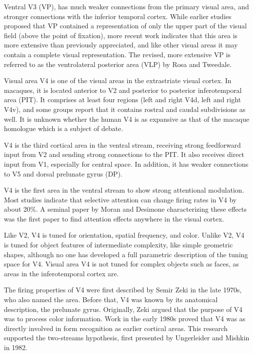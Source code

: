 Ventral V3 (VP), has much weaker connections from the primary visual area, and stronger connections with the inferior temporal cortex. While earlier studies proposed that VP contained a representation of only the upper part of the visual field (above the point of fixation), more recent work indicates that this area is more extensive than previously appreciated, and like other visual areas it may contain a complete visual representation. The revised, more extensive VP is referred to as the ventrolateral posterior area (VLP) by Rosa and Tweedale.

Visual area V4 is one of the visual areas in the extrastriate visual cortex. In macaques, it is located anterior to V2 and posterior to posterior inferotemporal area (PIT). It comprises at least four regions (left and right V4d, left and right V4v), and some groups report that it contains rostral and caudal subdivisions as well. It is unknown whether the human V4 is as expansive as that of the macaque homologue which is a subject of debate.

V4 is the third cortical area in the ventral stream, receiving strong feedforward input from V2 and sending strong connections to the PIT. It also receives direct input from V1, especially for central space. In addition, it has weaker connections to V5 and dorsal prelunate gyrus (DP).

V4 is the first area in the ventral stream to show strong attentional modulation. Most studies indicate that selective attention can change firing rates in V4 by about 20\%. A seminal paper by Moran and Desimone characterizing these effects was the first paper to find attention effects anywhere in the visual cortex.

Like V2, V4 is tuned for orientation, spatial frequency, and color. Unlike V2, V4 is tuned for object features of intermediate complexity, like simple geometric shapes, although no one has developed a full parametric description of the tuning space for V4. Visual area V4 is not tuned for complex objects such as faces, as areas in the inferotemporal cortex are.

The firing properties of V4 were first described by Semir Zeki in the late 1970s, who also named the area. Before that, V4 was known by its anatomical description, the prelunate gyrus. Originally, Zeki argued that the purpose of V4 was to process color information. Work in the early 1980s proved that V4 was as directly involved in form recognition as earlier cortical areas. This research supported the two-streams hypothesis, first presented by Ungerleider and Mishkin in 1982.

